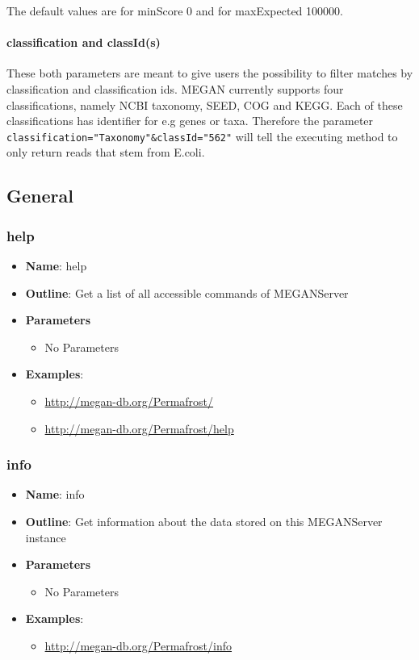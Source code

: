 \documentclass[11pt]{article}
\begin{document}
The default values are for minScore 0 and for maxExpected 100000.


\paragraph{classification and classId(s)}
\label{subsec:class}
These both parameters are meant to give users the possibility to filter matches by classification and classification ids. MEGAN currently supports four classifications, namely NCBI taxonomy, SEED, COG and KEGG. Each of these classifications has identifier for e.g genes or taxa. Therefore the parameter \texttt{classification="Taxonomy"\&classId="562"} will tell the executing method to only return reads that stem from E.coli.



\subsection{General}
\subsubsection{help}

\begin{itemize}
	\item \textbf{Name}: help
	\item \textbf{Outline}: Get a list of all accessible commands of MEGANServer
	\item \textbf{Parameters}
		\begin{itemize}
			\item No Parameters
		\end{itemize}
	\item \textbf{Examples}:
		\begin{itemize}	
			\item \url{http://megan-db.org/Permafrost/}
			\item \url{http://megan-db.org/Permafrost/help}
		\end{itemize}
\end{itemize}

\subsubsection{info}

\begin{itemize}
	\item \textbf{Name}: info
	\item \textbf{Outline}: Get information about the data stored on this MEGANServer instance
	\item \textbf{Parameters}
		\begin{itemize}
			\item No Parameters
		\end{itemize}
	\item \textbf{Examples}:
		\begin{itemize}	
			\item \url{http://megan-db.org/Permafrost/info}
		\end{itemize}
\end{itemize}
\end{document}
